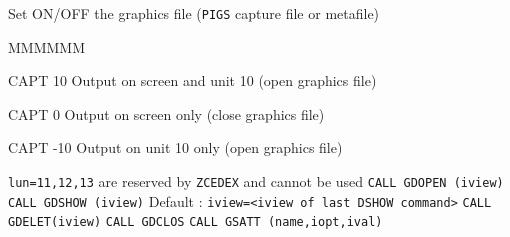   
        
         
 Set ON/OFF the graphics file ({\tt PIGS} capture file or  metafile)
\begin{DL}{MMMMMM}
\item[CAPT  10]    Output on screen and unit 10 (open graphics file)
\item[CAPT   0]    Output on screen only (close graphics file)
\item[CAPT -10]    Output on unit 10 only (open graphics file)
\end{DL}
{\tt lun=11,12,13} are reserved by {\tt ZCEDEX} and cannot be used
{\tt  CALL GDOPEN (iview)}
{\tt  CALL GDSHOW (iview)}
 Default : {\tt iview=<iview of last DSHOW command>}
{\tt  CALL GDELET(iview)}
{\tt  CALL GDCLOS}
{\tt  CALL GSATT (name,iopt,ival)}
